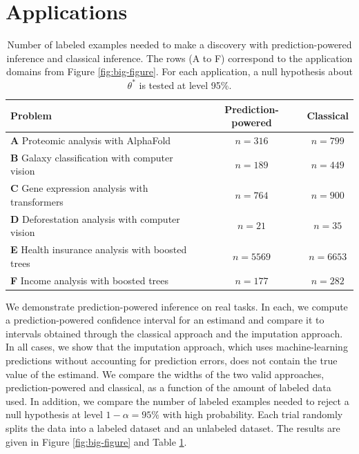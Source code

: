 \documentclass[10pt]{article}
\begin{document}
\section{Applications}
\label{sec:experiments}

\begin{table}[t]
\centering
\begin{tabular}{l|cc}
\hline
\textbf{Problem} & \textbf{Prediction-powered} & \textbf{Classical} \\
\hline
\textbf{A} Proteomic analysis with AlphaFold & \( n = 316 \) & \( n = 799 \) \\
\textbf{B} Galaxy classification with computer vision & \( n = 189 \) & \( n = 449 \) \\
\textbf{C} Gene expression analysis with transformers & \( n = 764 \) & \( n = 900 \) \\
\textbf{D} Deforestation analysis with computer vision & \( n = 21 \) & \( n = 35 \) \\
\textbf{E} Health insurance analysis with boosted trees & \( n = 5569 \) & \( n = 6653 \) \\
\textbf{F} Income analysis with boosted trees & \( n = 177 \) & \( n = 282 \) \\
\hline
\end{tabular}
\caption{Number of labeled examples needed to make a discovery with prediction-powered inference and classical inference. The rows (A to F) correspond to the application domains from Figure \ref{fig:big-figure}. For each application, a null hypothesis about $\theta^*$ is tested at level 95\%.}
\label{table:sample-size}

\end{table}


We demonstrate prediction-powered inference on real tasks. In each, we compute a prediction-powered confidence interval for an estimand and compare it to intervals obtained through the classical approach and the imputation approach. In all cases, we show that the imputation approach, which uses machine-learning predictions without accounting for prediction errors, does not contain the true value of the estimand. We compare the widths of the two valid approaches, prediction-powered and classical, as a function of the amount of labeled data used. In addition, we compare the number of labeled examples needed to reject a null hypothesis at level $1-\alpha=95\%$
with high probability. Each trial randomly splits the data into a labeled dataset and an unlabeled dataset. The results are given in Figure \ref{fig:big-figure} and Table \ref{table:sample-size}.
\end{document}
